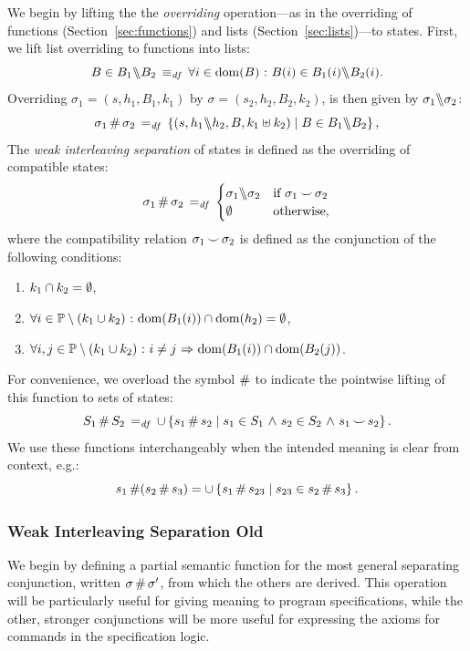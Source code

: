 \documentclass[11pt]{report}
\begin{document}
We begin by lifting the the \emph{overriding} operation---as in the overriding of functions (Section~\ref{sec:functions}) and lists (Section~\ref{sec:lists})---to states. First, we lift list overriding to functions into lists: \[ B \in B_1 \backslash\!\!\backslash B_2 \operatorname{\;\equiv_{\mathit{df}}\;} \forall i \in \operatorname{\mathrm{dom}}(B) \operatorname{\,:\,} B(i) \in B_1(i) \backslash\!\!\backslash B_2(i). \] Overriding $\sigma_1 = (s,h_1,B_1,k_1)$ by $\sigma = (s_2,h_2,B_2,k_2)$, is then given by $\sigma_1 \backslash\!\!\backslash \sigma_2$: \[ \sigma_1 \operatorname{\#} \sigma_2 \operatorname{\;=_{\mathit{df}}\;} \left\lbrace (s,h_1 \backslash\!\!\backslash h_2, B,k_1 \uplus k_2) \mid B \in B_1 \backslash\!\!\backslash B_2 \right\rbrace,\] The \emph{weak interleaving separation} of states is defined as the overriding of compatible states: \[ \sigma_1 \operatorname{\#} \sigma_2 \operatorname{\;=_{\mathit{df}}\;} \begin{cases}
	\sigma_1 \backslash\!\!\backslash \sigma_2 & \text{if $\sigma_1 \operatorname{\smile} \sigma_2$} \\ 
	\operatorname{\emptyset} & \text{otherwise,} \end{cases} \] where the compatibility relation $\sigma_1 \operatorname{\smile} \sigma_2$ is defined as the conjunction of the following conditions: \begin{enumerate}
	\item $k_1 \cap k_2 = \operatorname{\emptyset}$,
	\item $\forall i \in \mathbb{P} \setminus (k_1 \cup k_2) \operatorname{\,:\,} \operatorname{\mathrm{dom}}(B_1(i)) \cap \operatorname{\mathrm{dom}}(h_2) = \operatorname{\emptyset}$, 
	\item $\forall i,j \in \mathbb{P} \setminus (k_1 \cup k_2) \operatorname{\,:\,} i \neq j \operatorname{\,\Rightarrow\,} \operatorname{\mathrm{dom}}(B_1(i)) \cap \operatorname{\mathrm{dom}}(B_2(j))$. 
\end{enumerate}

For convenience, we overload the symbol $\operatorname{\#}$ to indicate the pointwise lifting of this function to sets of states: \[ S_1 \operatorname{\#} S_2 \operatorname{\;=_{\mathit{df}}\;} \cup \left\lbrace s_1 \operatorname{\#} s_2 \mid s_1 \in S_1 \operatorname{\,\wedge\,} s_2 \in S_2 \operatorname{\,\wedge\,} s_1 \operatorname{\smile} s_2 \right\rbrace.\] We use these functions interchangeably when the intended meaning is clear from context, e.g.: \[ s_1 \operatorname{\#} (s_2 \operatorname{\#} s_3) = \cup \left\lbrace s_1 \operatorname{\#} s_{23} \mid s_{23} \in s_2 \operatorname{\#} s_3 \right\rbrace.\]


\subsubsection{Weak Interleaving Separation Old}

We begin by defining a partial semantic function for the most general separating conjunction, written $\sigma \operatorname{\#} \sigma'$, from which the others are derived. This operation will be particularly useful for giving meaning to program specifications, while the other, stronger conjunctions will be more useful for expressing the axioms for commands in the specification logic. 
\end{document}
